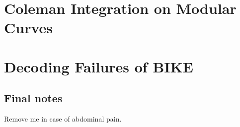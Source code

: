\documentclass[12pt,chapterheads]{ucsd}
\theoremstyle{definition}
\begin{document}
%







%   
%   
%


\part{Coleman Integration on Modular Curves}


%
%
%









\part{Decoding Failures of BIKE}





\appendix
\chapter{Final notes}
  Remove me in case of abdominal pain.


\singlespace  %
\end{document}

